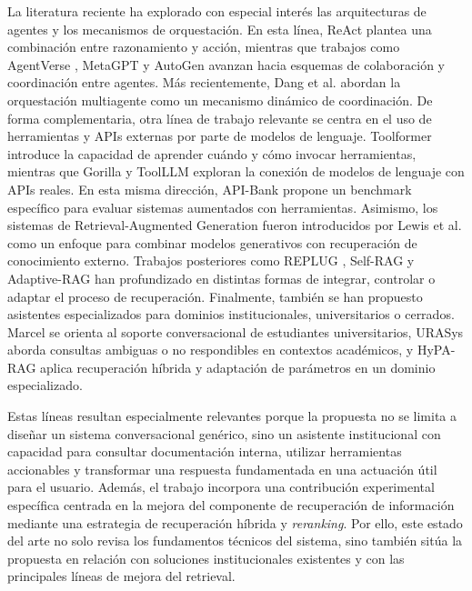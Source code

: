 La literatura reciente ha explorado con especial interés las arquitecturas de agentes y los mecanismos de orquestación. En esta línea, ReAct \parencite{yao2023react} plantea una combinación entre razonamiento y acción, mientras que trabajos como AgentVerse \parencite{chen2024agentverse}, MetaGPT \parencite{hong2024metagpt} y AutoGen \parencite{wu2024autogen} avanzan hacia esquemas de colaboración y coordinación entre agentes. Más recientemente, Dang et al. \parencite{dang2025evolving} abordan la orquestación multiagente como un mecanismo dinámico de coordinación.
De forma complementaria, otra línea de trabajo relevante se centra en el uso de herramientas y APIs externas por parte de modelos de lenguaje. Toolformer \parencite{schick2023toolformer} introduce la capacidad de aprender cuándo y cómo invocar herramientas, mientras que Gorilla \parencite{patil2024gorilla} y ToolLLM \parencite{qin2024toolllm} exploran la conexión de modelos de lenguaje con APIs reales. En esta misma dirección, API-Bank \parencite{li2023apibank} propone un benchmark específico para evaluar sistemas aumentados con herramientas.
Asimismo, los sistemas de Retrieval-Augmented Generation fueron introducidos por Lewis et al. \parencite{lewis2020rag} como un enfoque para combinar modelos generativos con recuperación de conocimiento externo. Trabajos posteriores como REPLUG \parencite{shi2024replug}, Self-RAG \parencite{asai2024selfrag} y Adaptive-RAG \parencite{jeong2024adaptiverag} han profundizado en distintas formas de integrar, controlar o adaptar el proceso de recuperación.
Finalmente, también se han propuesto asistentes especializados para dominios institucionales, universitarios o cerrados. Marcel \parencite{trienes2025marcel} se orienta al soporte conversacional de estudiantes universitarios, URASys \parencite{nguyen2025urasys} aborda consultas ambiguas o no respondibles en contextos académicos, y HyPA-RAG \parencite{kalra2025hyparag} aplica recuperación híbrida y adaptación de parámetros en un dominio especializado.

Estas líneas resultan especialmente relevantes porque la propuesta no se limita a diseñar un sistema conversacional genérico, sino un asistente institucional con capacidad para consultar documentación interna, utilizar herramientas accionables y transformar una respuesta fundamentada en una actuación útil para el usuario. 
Además, el trabajo incorpora una contribución experimental específica centrada en la mejora del componente de recuperación de información mediante una estrategia de recuperación híbrida y \textit{reranking}. 
Por ello, este estado del arte no solo revisa los fundamentos técnicos del sistema, sino también sitúa la propuesta en relación con soluciones institucionales existentes y con las principales líneas de mejora del retrieval.

